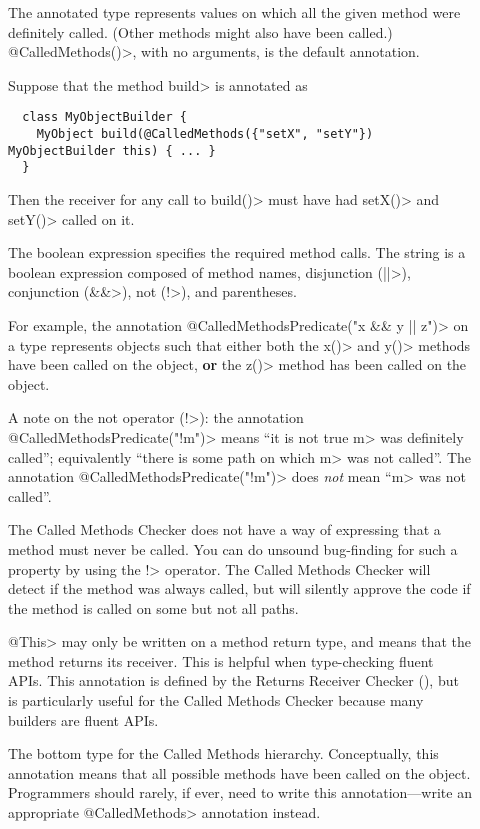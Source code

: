 \begin{description}
\item[]
  The annotated type represents values on which all the given method were definitely called.
  (Other methods might also have been called.) \<@CalledMethods()>, with no
  arguments, is the default annotation.

  Suppose that the method \<build> is annotated as

  \begin{Verbatim}
  class MyObjectBuilder {
    MyObject build(@CalledMethods({"setX", "setY"}) MyObjectBuilder this) { ... }
  }
  \end{Verbatim}

  Then the receiver for any call to \<build()> must have had \<setX()> and \<setY()> called on it.

\item[]
  The boolean expression specifies the required method calls.  The string
  is a boolean expression composed of method names, disjunction (\<||>),
  conjunction (\<\&\&>), not (\<!>), and parentheses.

  For example, the annotation \<@CalledMethodsPredicate("x \&\& y || z")> on a type represents
  objects such that either both the  \<x()> and \<y()> methods have been called on the object, \textbf{or}
  the \<z()> method has been called on the object.

  A note on the not operator (\<!>): the annotation
  \<@CalledMethodsPredicate("!m")> means ``it is not true \<m> was
  definitely called''; equivalently ``there is some path on which \<m> was
  not called''.  The annotation \<@CalledMethodsPredicate("!m")> does
  \emph{not} mean ``\<m> was not called''.

  The Called Methods Checker does not have a way of expressing that a
  method must never be called.  You can do unsound bug-finding for such a
  property by using the \<!> operator.  The Called Methods Checker will
  detect if the method was always called, but will silently approve the code
  if the method is called on some but not all paths.

\item[]
  \<@This> may only be written on a method return type, and means that the method returns its receiver.
  This is helpful when type-checking fluent APIs. This annotation is defined by the
  Returns Receiver Checker (), but is particularly useful
  for the Called Methods Checker because many builders are fluent APIs.

\item[]
  The bottom type for the Called Methods hierarchy. Conceptually, this annotation
  means that all possible methods have been called on the object. Programmers should rarely,
  if ever, need to write this annotation---write an appropriate \<@CalledMethods> annotation
  instead.

\end{description}

